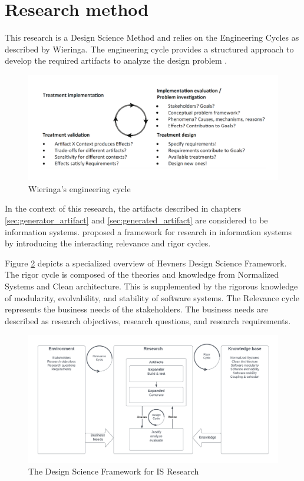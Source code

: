 \section{Research method} \label{sec:research_method}

This research is a Design Science Method and relies on the Engineering Cycles as described
by Wieringa. The engineering cycle provides a structured approach to develop the
required artifacts to analyze the design problem \parencite{wieringa_design_2014}.

\begin{figure}[H]
    \centering
    \includegraphics[width=1\textwidth]{Figures/engineering_cycle.pdf}
    \caption[Engineering cycle]{Wieringa's engineering cycle}
    \label{fig:engineering_cycle}
\end{figure}

In the context of this research, the artifacts described in chapters
\ref{sec:generator_artifact} and \ref{sec:generated_artifact} are considered to be
information systems. \citeauthor{hevner_design_nodate} proposed a framework for research
in information systems by introducing the interacting relevance and rigor cycles.

Figure \ref{fig:dsr} depicts a specialized overview of Hevners Design Science Framework.
The rigor cycle is composed of the theories and knowledge from Normalized Systems
and Clean architecture. This is supplemented by the rigorous knowledge of modularity,
evolvability, and stability of software systems. The Relevance cycle represents the
business needs of the stakeholders. The business needs are described as research
objectives, research questions, and research requirements.

\begin{figure}[H]
    \centering
    \includegraphics[width=1\textwidth]{Figures/rigor_relevance_cycle.pdf}
    \caption[DSF]{The Design Science Framework for IS Research}
    \label{fig:dsr}
\end{figure}